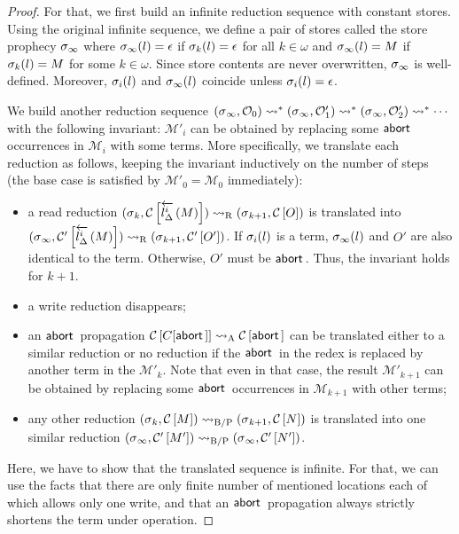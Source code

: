 {\begin{proof}
For that, we first
build an infinite reduction sequence with constant stores.
Using the original infinite sequence, we define a pair of stores called the
store prophecy $\lstore_\infty$ where
$ \lstore_\infty(l)= \epsilon$ if $\lstore_k(l)=\epsilon$ for all
 $k\in\omega$ and
$ \lstore_\infty(l)=M $ if $\lstore_k(l)=M$ for some $k\in\omega$.
Since store contents are never overwritten,
$\lstore_\infty$ is well-defined.
Moreover,
$\lstore_i(l)$ and $\lstore_\infty(l)$ coincide unless
$\lstore_i(l)=\epsilon$.

We build another reduction sequence
$
\conf{_\infty}{\hypert_0}
\reduce^\ast
\conf{_\infty}{\hypert'_1}
\reduce^\ast
\conf{_\infty}{\hypert'_2}
\reduce^\ast\cdots
$
with the following invariant:
$\mathcal M'_i$ can be obtained by replacing some $\abort$ occurrences
in $\mathcal M_i$ with some terms.
More specifically, we translate each reduction as follows, keeping the
invariant inductively on the number of steps
(the base case is satisfied by $\mathcal M'_0 = \mathcal M_0$ immediately):
\begin{itemize}
 \item a read reduction $\conf{_k}{\hypc{}{\rtol i l\Delta M}}
       \rreduce
       \conf{_{k+1}}{\hypc{}{O}}$ is translated into
       $\conf{_\infty}{\hypc'{\rtol i l\Delta M}} \rreduce
       \conf{_{k+1}}{\hypc'{O'}}$.
       If $\lstore_i(l)$ is a term,
       $\lstore_\infty(l)$ and $O'$ are also identical to the term.
       Otherwise, $O'$ must be $\abort$.
       Thus, the invariant
       holds for $k+1$.
 \item a write reduction disappears;
 \item an $\abort$ propagation
       $\hypc{}{C[\abort]} \areduce \hypc{}{\abort}$ can be translated
       either to a similar reduction or no reduction if the $\abort$ in
       the redex is replaced by another term in the $\mathcal{M'}_k$.
       Note that even in that case, the result $\mathcal{M'}_{k+1}$ can
       be obtained by replacing some $\abort$ occurrences in
       $\mathcal{M}_{k+1}$ with other terms;
 \item any other reduction $\conf{_k}{\hypc{}{M}} \bpreduce
       \conf{_{k+1}}{\hypc{}{N}}$
       is translated into one similar reduction
       $\conf{_\infty}{\hypc{'}{M'}}\bpreduce
        \conf{_\infty}{\hypc{'}{N'}}$.
\end{itemize}
Here, we have to show that the translated sequence is infinite.
 For that, we can use the facts that
 there are only finite
number of mentioned locations each of which allows only one write, and that
an $\abort$ propagation always
strictly shortens the term under operation.


\end{proof}}
